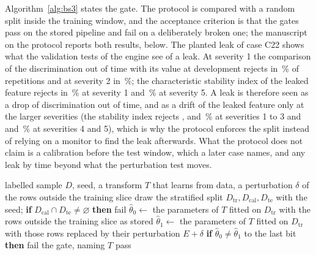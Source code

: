 Algorithm~\ref{alg:bs3} states the gate. The protocol is compared with a random split inside the training window, and the acceptance criterion is that
the gates pass on the stored pipeline and fail on a deliberately broken one; the manuscript on the protocol reports both results, below.
The planted leak of case C22 shows what the validation tests of the engine see of a leak. At severity 1 the comparison of the discrimination out of
time with its value at development rejects in \pxOneLeakAucOne{}\,\% of \pxOneLeakReps{} repetitions and at severity 2 in \pxOneLeakAucTwo{}\,\%; the characteristic
stability index of the leaked feature rejects in \pxOneLeakCsiOne{}\,\% at severity 1 and \pxOneLeakCsiFive{}\,\% at severity 5. A leak is therefore seen
as a drop of discrimination out of time, and as a drift of the leaked feature only at the larger severities (the stability index rejects \pxOneLeakCsiOne{},
\pxOneLeakCsiTwo{} and \pxOneLeakCsiThree{}\,\% at severities 1 to 3 and \pxOneLeakCsiFour{} and \pxOneLeakCsiFive{}\,\% at severities 4 and 5), which is why the protocol enforces the split instead of relying
on a monitor to find the leak afterwards. What the protocol does not claim is a calibration before the test window, which a later case names, and any
leak by time beyond what the perturbation test moves.

\begin{algorithm}[htbp]
\caption{Perturbation gate of one fitted transform.}
\label{alg:bs3}
\begin{algorithmic}[1]
\Require labelled sample $D$, seed, a transform $T$ that learns from data, a perturbation $\delta$ of the rows outside the training slice
\State draw the stratified split $D_{\mathrm{tr}},D_{\mathrm{cal}},D_{\mathrm{te}}$ with the seed; \textbf{if} $D_{\mathrm{cal}}\cap D_{\mathrm{te}}\neq\varnothing$ \textbf{then} fail
\State $\hat\theta_{0}\gets$ the parameters of $T$ fitted on $D_{\mathrm{tr}}$ with the rows outside the training slice as stored
\State $\hat\theta_{1}\gets$ the parameters of $T$ fitted on $D_{\mathrm{tr}}$ with those rows replaced by their perturbation $E+\delta$
\State \textbf{if} $\hat\theta_{0}\neq\hat\theta_{1}$ to the last bit \textbf{then} fail the gate, naming $T$
\State \Return pass
\end{algorithmic}
\end{algorithm}

